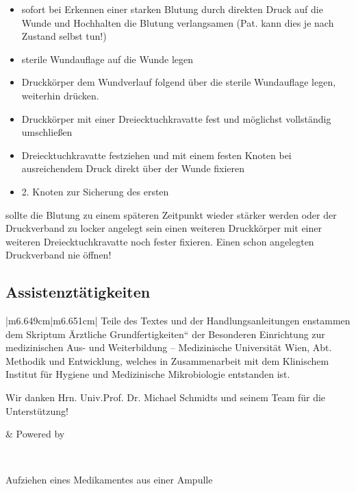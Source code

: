 \documentclass{article}
\begin{document}
\begin{itemize}
\item sofort bei Erkennen einer starken Blutung durch direkten Druck auf
die Wunde und Hochhalten die Blutung verlangsamen (Pat. kann dies je
nach Zustand selbst tun!)

\item sterile Wundauflage auf die Wunde legen

\item Druckk\"orper dem Wundverlauf folgend \"uber die sterile
Wundauflage legen, weiterhin dr\"ucken.

\item Druckk\"orper mit einer Dreiecktuchkravatte fest und m\"oglichst
vollst\"andig umschlie{\ss}en

\item Dreiecktuchkravatte festziehen und mit einem festen Knoten bei
ausreichendem Druck direkt \"uber der Wunde fixieren

\item 2. Knoten zur Sicherung des ersten

\end{itemize}
sollte die Blutung zu einem sp\"ateren Zeitpunkt wieder st\"arker werden
oder der Druckverband zu locker angelegt sein einen weiteren
Druckk\"orper mit einer weiteren Dreiecktuchkravatte noch fester
fixieren. Einen schon angelegten Druckverband nie \"offnen!

\subsection{Assistenzt\"atigkeiten}
\begin{center}
\tablehead{}\begin{supertabular}{|m{6.649cm}|m{6.651cm}|}
\hline
Teile des Textes und der Handlungsanleitungen enstammen dem Skriptum
{\quotedblbase}\"Arztliche Grundfertigkeiten{\textquotedblleft} der 
Besonderen Einrichtung zur medizinischen Aus- und Weiterbildung --
Medizinische Universit\"at Wien, Abt. Methodik und Entwicklung, welches
in Zusammenarbeit  mit dem Klinischem Institut f\"ur Hygiene und
Medizinische Mikrobiologie entstanden ist. 

Wir danken Hrn. Univ.Prof. Dr. Michael Schmidts und seinem Team f\"ur
die Unterst\"utzung!

 &
Powered by

 \par

\\\hline
\end{supertabular}
\end{center}
Aufziehen eines Medikamentes aus einer Ampulle
\end{document}
